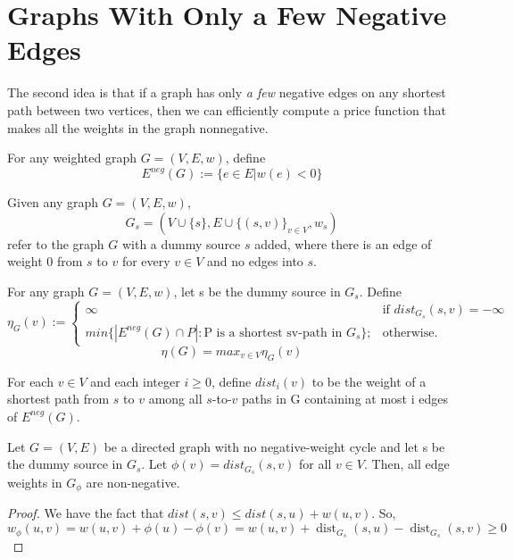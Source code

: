 \documentclass[11pt]{article}
\newcommand{\dist}{\operatorname{dist}}
\newcommand{\eneg}{E^{neg}}
\begin{document}
\section{Graphs With Only a Few Negative Edges}
\label{sec:fewneg}
The second idea is that if a graph has only \emph{a few} negative edges on any shortest path between two vertices, then we can efficiently compute a price function that makes all the weights in the graph nonnegative.

\begin{definition}[$\eneg(G)$]
    For any weighted graph $G=(V, E, w)$, define
    $$\eneg(G) := \{e \in E | w(e) < 0\}$$
\end{definition}

\begin{definition}[$G_s$]
    Given any graph $G=(V, E, w)$,
    $$G_s = (V \cup \{s\}, E \cup \{(s, v)\}_{v \in V}, w_s)$$ refer to the graph $G$ with a dummy source $s$ added, where there is an edge of weight 0 from $s$ to $v$ for every $v \in V$ and no edges into $s$.
\end{definition}

\begin{definition} \label{def:numberofnegedges}
    For any graph $G=(V, E, w)$, let s be the dummy source in $G_s$. Define
    $$\eta_G(v) := \begin{cases}\infty &\text{if } dist_{G_s}(s, v) = -\infty\\
    min\{|\eneg(G)\cap P|: \text{P is a shortest sv-path in } G_s\}; &\text{otherwise}.\end{cases}$$
    $$\eta(G) = max_{v \in V} \eta_G(v)$$
\end{definition}

\begin{definition}[$dist_i(v)$] \label{def:distwithnegedges}
    For each $v \in V$ and each integer $i \ge 0$, define $dist_i(v)$ to be the weight of a shortest path from $s$ to $v$ among all $s$-to-$v$ paths in G containing at most i edges of $\eneg(G)$. 
\end{definition}

\begin{lemma} \label{lem:distpf}
    Let $G=(V,E)$ be a directed graph with no negative-weight cycle and let s be the dummy source in $G_s$. Let $\phi(v) = dist_{G_s}(s, v)$ for all $v \in V$. Then, all edge weights in $G_\phi$ are non-negative.
\end{lemma}
\begin{proof}
    We have the fact that $dist(s, v) \le dist(s, u) + w(u, v)$. So,
    $$w_\phi(u, v) = w(u, v) + \phi(u) - \phi(v) = w(u, v) + \dist_{G_s}(s, u) - \dist_{G_s}(s, v) \ge 0$$
\end{proof}
\end{document}
